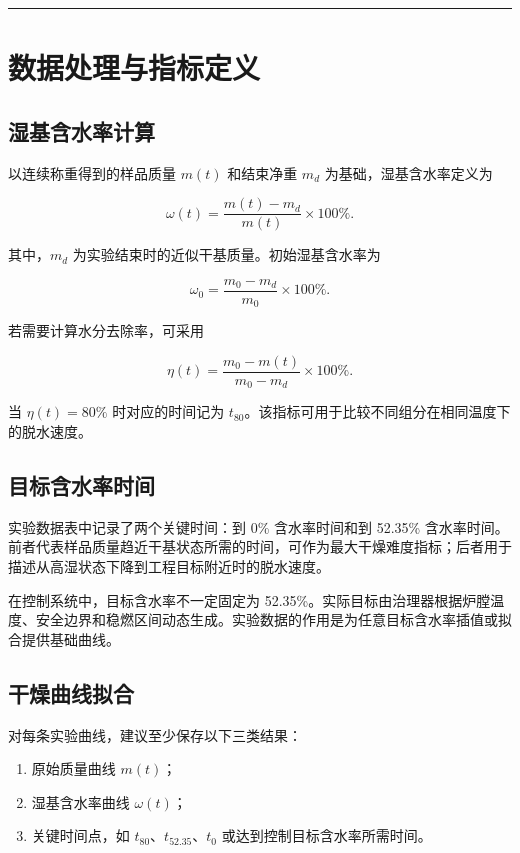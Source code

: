 \documentclass[UTF8,openany,zihao=-4,oneside]{ctexbook}
\newcommand{\manualdivider}{\par\vspace{0.6em}\noindent\textcolor{FGLine}{\rule{\linewidth}{0.7pt}}\vspace{0.6em}\par}
\begin{document}
\manualdivider

\chapter{数据处理与指标定义}

\section{湿基含水率计算}

以连续称重得到的样品质量 $m(t)$ 和结束净重 $m_d$ 为基础，湿基含水率定义为

\begin{equation}
\omega(t)=\frac{m(t)-m_d}{m(t)}\times 100\% .
\label{eq:wet-basis-moisture}
\end{equation}

其中，$m_d$ 为实验结束时的近似干基质量。初始湿基含水率为

\begin{equation}
\omega_0=\frac{m_0-m_d}{m_0}\times 100\% .
\label{eq:initial-moisture}
\end{equation}

若需要计算水分去除率，可采用

\begin{equation}
\eta(t)=\frac{m_0-m(t)}{m_0-m_d}\times 100\% .
\label{eq:removal-ratio}
\end{equation}

当 $\eta(t)=80\%$ 时对应的时间记为 $t_{80}$。该指标可用于比较不同组分在相同温度下的脱水速度。

\section{目标含水率时间}

实验数据表中记录了两个关键时间：到 0\% 含水率时间和到 52.35\% 含水率时间。前者代表样品质量趋近干基状态所需的时间，可作为最大干燥难度指标；后者用于描述从高湿状态下降到工程目标附近时的脱水速度。

在控制系统中，目标含水率不一定固定为 52.35\%。实际目标由治理器根据炉膛温度、安全边界和稳燃区间动态生成。实验数据的作用是为任意目标含水率插值或拟合提供基础曲线。

\section{干燥曲线拟合}

对每条实验曲线，建议至少保存以下三类结果：

\begin{enumerate}
\item 原始质量曲线 $m(t)$；
\item 湿基含水率曲线 $\omega(t)$；
\item 关键时间点，如 $t_{80}$、$t_{52.35}$、$t_{0}$ 或达到控制目标含水率所需时间。
\end{enumerate}
\end{document}
